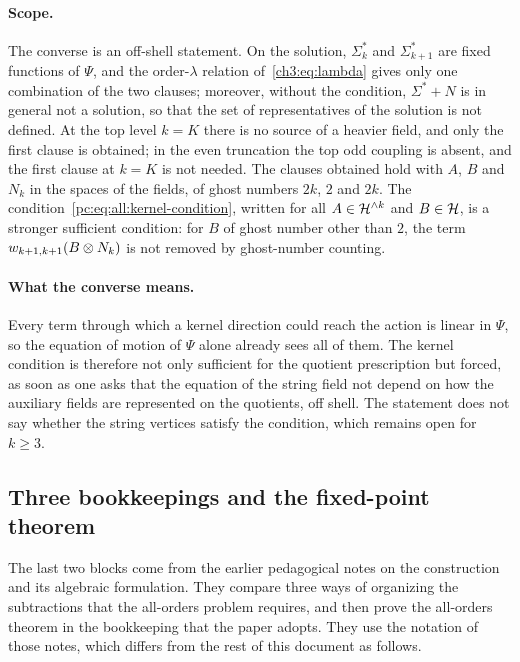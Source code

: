 \paragraph{Scope.}

The converse is an off-shell statement.
On the solution, $\Sigma_k^*$ and $\Sigma_{k + 1}^*$ are fixed functions of $\Psi$, and the order-$\lambda$ relation of~\eqref{ch3:eq:lambda} gives only one combination of the two clauses; moreover, without the condition, $\Sigma^* + N$ is in general not a solution, so that the set of representatives of the solution is not defined.
At the top level $k = K$ there is no source of a heavier field, and only the first clause is obtained; in the even truncation the top odd coupling is absent, and the first clause at $k = K$ is not needed.
The clauses obtained hold with $A$, $B$ and $N_k$ in the spaces of the fields, of ghost numbers $2 k$, $2$ and $2 k$.
The condition~\eqref{pc:eq:all:kernel-condition}, written for all $A \in \mathcal{H}^{\wedge k}$ and $B \in \mathcal{H}$, is a stronger sufficient condition: for $B$ of ghost number other than $2$, the term $w_{k + 1,k + 1}(B \otimes N_k)$ is not removed by ghost-number counting.

\paragraph{What the converse means.}

Every term through which a kernel direction could reach the action is linear in $\Psi$, so the equation of motion of $\Psi$ alone already sees all of them.
The kernel condition is therefore not only sufficient for the quotient prescription but forced, as soon as one asks that the equation of the string field not depend on how the auxiliary fields are represented on the quotients, off shell.
The statement does not say whether the string vertices satisfy the condition, which remains open for $k \ge 3$.

\subsection{Three bookkeepings and the fixed-point theorem}
\label{ch3:sec:schemes}

The last two blocks come from the earlier pedagogical notes on the construction and its algebraic formulation.
They compare three ways of organizing the subtractions that the all-orders problem requires, and then prove the all-orders theorem in the bookkeeping that the paper adopts.
They use the notation of those notes, which differs from the rest of this document as follows.

